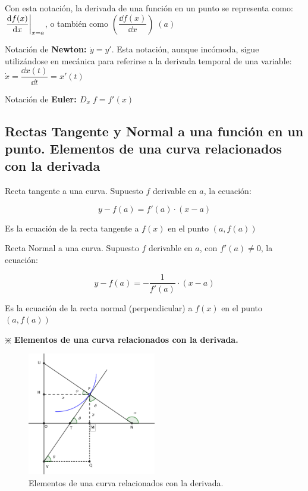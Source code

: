 	
	  Con esta notación, la derivada de una función en un punto se representa como:  $\eval{ \dfrac {\dd f(x)}{\dd x} }_{x=a} $, o también como $\left( \dfrac {\dd f(x)}{\dd x}  \right)\; (a)$
	  
	  
	  
	  
	  Notación de \textbf{Newton: $ \dot { y }=y' $}. Esta notación, aunque incómoda, sigue utilizándose en mecánica para referirse a la derivada temporal de una variable:  $\dot {x}= \dfrac {\dd x(t)}{\dd t}=x'(t)$

	  
	Notación de \textbf{Euler: $D_x \; f=f'(x)$}
	
	\subsection{Rectas Tangente y Normal a una función en un punto. Elementos de una curva relacionados con la derivada}
	 \label{subsec:RTN} 
	  
	  \begin{defi}Recta tangente a una curva. Supuesto $f$ derivable en $a$, la ecuación:
	  
	  \begin{equation}
	  	\boxed{\; y-f(a)=f'(a)\cdot(x-a) \; }
	  	\label{eq:recta-tangente}
	  \end{equation}
	  	
	  	Es la ecuación de la recta tangente a $f(x)$ en el punto $(a,f(a))$
	  \end{defi}
	  
	  \begin{defi}Recta Normal a una curva. Supuesto $f$ derivable en $a$, con $f'(a)\neq 0$, la ecuación:
	  
	  \begin{equation}
	  	\boxed{ \; y-f(a)=-\dfrac 1 {f'(a)}\cdot(x-a) \; }
	  	\label{eq:recta-normal}
	  \end{equation}
	  	
	  	Es la ecuación de la recta normal (perpendicular) a $f(x)$ en el punto $(a,f(a))$
	  \end{defi}
	  
	  
	   $\divideontimes$ \textbf{Elementos de una curva relacionados con la derivada.}
	  
	 \begin{figure}[H]
		\centering
		\includegraphics[width=0.5\textwidth]{imagenes/imagenes04/T04IM02.png}
		\caption {Elementos de una curva relacionados con la derivada.}
	\end{figure}
	
